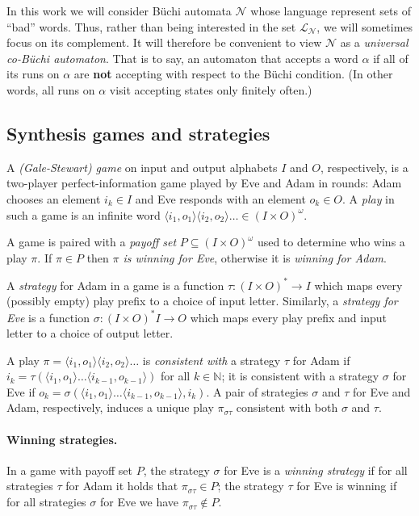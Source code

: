 \documentclass[runningheads,a4paper,draft]{llncs}
\newcommand{\eve}{Eve\xspace}
\newcommand{\adam}{Adam\xspace}
\newcommand{\calN}{\mathcal{N}}
\newcommand{\lang}[1]{\mathcal{L}_{#1}}
\newcommand{\out}[2]{\pi_{#1#2}}
\begin{document}
In this work we will consider B\"uchi automata $\calN$ whose
language represent sets of ``bad'' words. Thus, rather than being interested in
the set $\lang{\calN}$, we will sometimes focus on its complement. It will
therefore be convenient to view $\calN$ as a \emph{universal
co-B\"uchi automaton}. That is to say, an automaton that accepts a word $\alpha$
if all of its runs on $\alpha$ are \textbf{not} accepting with respect to the
B\"uchi condition. (In other words, all runs on $\alpha$ visit accepting states
only finitely often.)

\subsection{Synthesis games and strategies}
\begin{definition}[Games]
  A \emph{(Gale-Stewart) game} on input and output alphabets $I$ and $O$,
  respectively, is a two-player perfect-information game played by \eve and
  \adam in rounds: \adam chooses an element $i_k \in I$ and \eve responds with
  an element $o_k \in O$. A \emph{play} in such a game is an infinite word
  $\langle i_1, o_1\rangle \langle i_2, o_2\rangle \dots \in (I\times O)^\omega$. 
\end{definition}
A game is paired with a \emph{payoff set} $P \subseteq (I \times
O)^\omega$ used to determine who wins a play $\pi$. If $\pi \in P$ then
\emph{$\pi$ is winning for \eve}, otherwise it is \emph{winning for \adam}.

\begin{definition}[Strategies]
  A \emph{strategy} for \adam in a game is a function $\tau : (I \times O)^*
  \to I$ which maps every (possibly empty) play prefix
  to a choice of input letter.  Similarly, a \emph{strategy for \eve}
  is a function $\sigma : (I \times O)^* I \to O$ which maps every play prefix
  and input letter to a choice of output letter.
\end{definition}
A play $\pi = \langle i_1, o_1\rangle \langle i_2, o_2\rangle \dots$ is
\emph{consistent with} a strategy $\tau$ for \adam if $i_k = \tau( \langle
i_1, o_1\rangle \dots \langle i_{k-1}, o_{k-1}\rangle)$ for all $k \in
\mathbb{N}$; it is consistent with a strategy $\sigma$ for \eve if $o_k =
\sigma( \langle i_1, o_1\rangle \dots \langle i_{k-1}, o_{k-1}\rangle,
i_{k})$.  A pair of strategies $\sigma$ and $\tau$ for \eve and \adam,
respectively, induces a unique play $\out{\sigma}{\tau}$ consistent with both
$\sigma$ and $\tau$.

\paragraph*{Winning strategies.}
In a game with payoff set $P$, the strategy $\sigma$ for \eve is a \emph{winning
strategy} if for all strategies $\tau$ for \adam it holds that
$\out{\sigma}{\tau} \in P$; the strategy $\tau$ for \eve is winning if for all
strategies $\sigma$ for \eve we have $\out{\sigma}{\tau} \not\in P$.
\end{document}
